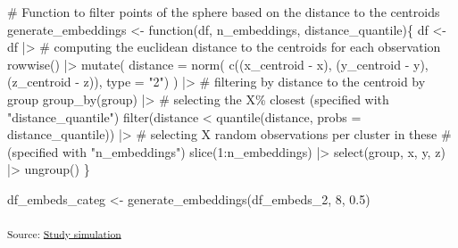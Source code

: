 \documentclass[
  authoryear]{elsarticle}
\newenvironment{Shaded}{\begin{snugshade}}{\end{snugshade}}
\newcommand{\BuiltInTok}[1]{\textcolor[rgb]{0.00,0.23,0.31}{#1}}
\newcommand{\CommentTok}[1]{\textcolor[rgb]{0.37,0.37,0.37}{#1}}
\newcommand{\DecValTok}[1]{\textcolor[rgb]{0.68,0.00,0.00}{#1}}
\newcommand{\FloatTok}[1]{\textcolor[rgb]{0.68,0.00,0.00}{#1}}
\newcommand{\NormalTok}[1]{\textcolor[rgb]{0.00,0.23,0.31}{#1}}
\newcommand{\OperatorTok}[1]{\textcolor[rgb]{0.37,0.37,0.37}{#1}}
\newcommand{\StringTok}[1]{\textcolor[rgb]{0.13,0.47,0.30}{#1}}
\begin{document}
\begin{Shaded}
\begin{Highlighting}[]
\CommentTok{\# Function to filter points of the sphere based on the distance to the centroids}
\NormalTok{generate\_embeddings }\OperatorTok{\textless{}{-}}\NormalTok{ function(df, n\_embeddings, distance\_quantile)\{}
\NormalTok{  df }\OperatorTok{\textless{}{-}} 
\NormalTok{    df }\OperatorTok{|\textgreater{}} 
    \CommentTok{\# computing the euclidean distance to the centroids for each observation}
\NormalTok{    rowwise() }\OperatorTok{|\textgreater{}} 
\NormalTok{    mutate(}
\NormalTok{      distance }\OperatorTok{=}\NormalTok{ norm(}
\NormalTok{        c((x\_centroid }\OperatorTok{{-}}\NormalTok{ x), (y\_centroid }\OperatorTok{{-}}\NormalTok{ y), (z\_centroid }\OperatorTok{{-}}\NormalTok{ z)),}
        \BuiltInTok{type} \OperatorTok{=} \StringTok{"2"}\NormalTok{)}
\NormalTok{      ) }\OperatorTok{|\textgreater{}} 
    \CommentTok{\# filtering by distance to the centroid by group}
\NormalTok{    group\_by(group) }\OperatorTok{|\textgreater{}} 
    \CommentTok{\# selecting the X\% closest (specified with "distance\_quantile")}
    \BuiltInTok{filter}\NormalTok{(distance }\OperatorTok{\textless{}}\NormalTok{ quantile(distance, probs }\OperatorTok{=}\NormalTok{ distance\_quantile)) }\OperatorTok{|\textgreater{}} 
    \CommentTok{\# selecting X random observations per cluster in these }
    \CommentTok{\# (specified with "n\_embeddings")}
    \BuiltInTok{slice}\NormalTok{(}\DecValTok{1}\NormalTok{:n\_embeddings) }\OperatorTok{|\textgreater{}} 
\NormalTok{    select(group, x, y, z) }\OperatorTok{|\textgreater{}}
\NormalTok{    ungroup()}
\NormalTok{\}}

\NormalTok{df\_embeds\_categ }\OperatorTok{\textless{}{-}}\NormalTok{ generate\_embeddings(df\_embeds\_2, }\DecValTok{8}\NormalTok{, }\FloatTok{0.5}\NormalTok{)}
\end{Highlighting}
\end{Shaded}

\textsubscript{Source:
\href{https://m-delem.github.io/2499-similarity-manuscript/notebooks/simulation-code-preview.html\#cell-categorical-embeddings}{Study
simulation}}
\end{document}
